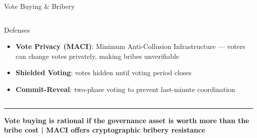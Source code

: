 \documentclass[8pt,aspectratio=169]{beamer}
\newcommand{\bottomnote}[1]{\vfill\vspace{-2mm}\textcolor{mllavender2}{\rule{\textwidth}{0.4pt}}\vspace{1mm}\footnotesize\textbf{#1}}
\begin{document}
\begin{frame}{Vote Buying \& Bribery}
\begin{columns}[t]
\begin{block}{Defenses}
\begin{itemize}\small
  \item \textbf{Vote Privacy (MACI)}: Minimum Anti-Collusion Infrastructure --- voters can change votes privately, making bribes unverifiable
  \item \textbf{Shielded Voting}: votes hidden until voting period closes
  \item \textbf{Commit-Reveal}: two-phase voting to prevent last-minute coordination
\end{itemize}
\end{block}
\end{columns}
\bottomnote{Vote buying is rational if the governance asset is worth more than the bribe cost | MACI offers cryptographic bribery resistance}
\end{frame}
\end{document}
